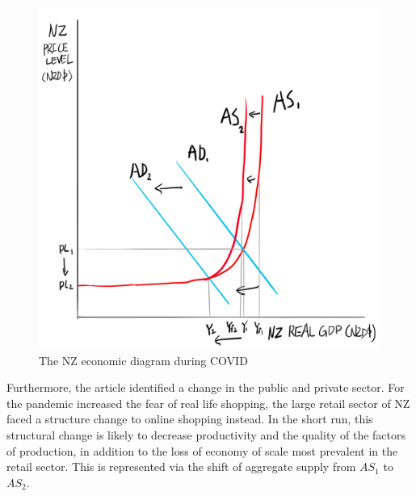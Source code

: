 \documentclass[a4paper,12pt]{article}
\begin{document}
\begin{figure}[H]
    \centering
    \includegraphics[scale=0.6]{assets/asad.png}
    \caption{The NZ economic diagram during COVID}
    \label{fig:asad}
\end{figure}

Furthermore, the article identified a change in the public and private sector. For the pandemic increased the fear of real life shopping, the large retail sector of NZ faced a structure change to online shopping instead. In the short run, this structural change is likely to decrease productivity and the quality of the factors of production, in addition to the loss of economy of scale most prevalent in the retail sector. This is represented via the shift of aggregate supply from $AS_1$ to $AS_2$.
\end{document}
